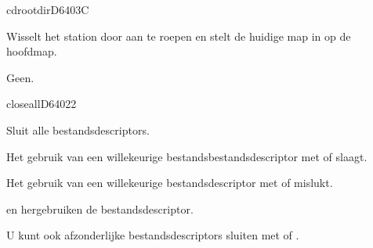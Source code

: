 \newpage
\begin{hyppotrap}{cdrootdir}{D640}{3C}

\item [Dienst:]  Wisselt het station door  aan te roepen en stelt de huidige map in op de hoofdmap.
\item [Invoer:]  
\item [Voorbeding:]  Geen.
\item [Resultaat:]  
\item [Geschiedenis:]
\end{hyppotrap}

\newpage
\begin{hyppotrap}{closeall}{D640}{22}

\item [Dienst:]  Sluit alle bestandsdescriptors.
\item [Nawerking:]  Het gebruik van een willekeurige bestandsbestandsdescriptor met  of  slaagt.

  Het gebruik van een willekeurige bestandsdescriptor met  of  mislukt.

   en  hergebruiken de bestandsdescriptor.\item [Geschiedenis:]
\item [Opmerkingen:]  U kunt ook afzonderlijke bestandsdescriptors sluiten met  of .
\end{hyppotrap}


